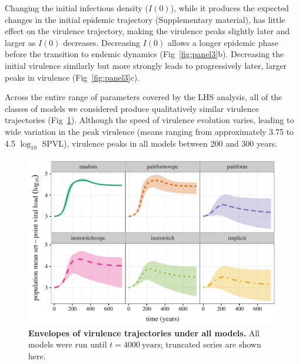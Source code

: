 \documentclass[10pt,letterpaper]{article}
\renewcommand{\figurename}{Fig}
\newcommand{\Lspvl}{$\log_{10}$ SPVL}
\begin{document}
Changing the initial infectious density ($I(0)$), while it produces the expected changes in the initial epidemic trajectory (Supplementary material), has little effect on the virulence trajectory, making the virulence peaks slightly later and larger as $I(0)$ decreases. Decreasing $I(0)$ allows a longer epidemic phase before the transition to endemic dynamics (\figurename~\ref{fig:panel3}b). Decreasing the initial virulence similarly but more strongly leads to progressively later, larger peaks in virulence (\figurename~\ref{fig:panel3}c).

Across the entire range of parameters covered by the LHS analysis, all of the classes of models we considered produce qualitatively similar virulence trajectories (\figurename~\ref{fig:virtraj}). Although the speed of virulence evolution varies, leading to wide variation in the peak virulence (means ranging from approximately 3.75 to 4.5 \Lspvl), virulence peaks in all models between 200 and 300 years.

\begin{figure}[!ht]
\includegraphics[width=\textwidth]{../figures/fig2.pdf}
\caption{{\bf Envelopes of virulence trajectories under all models.}
All models were run until $t=4000~\textrm{years}$; truncated series are shown here.}
\label{fig:virtraj}
\end{figure}
\end{document}
